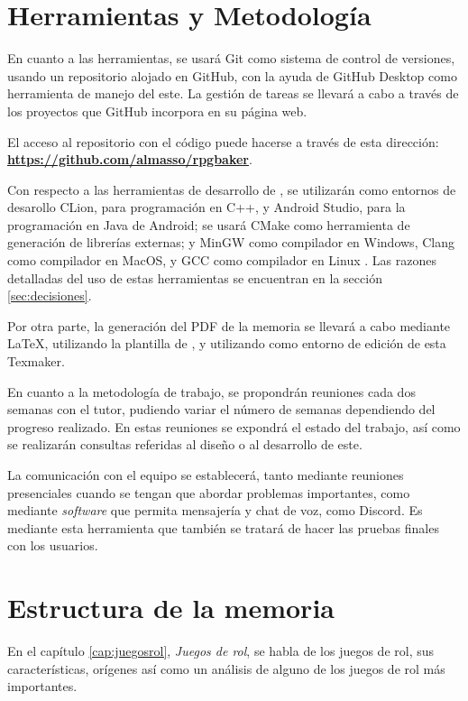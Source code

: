 \section{Herramientas y Metodología}
En cuanto a las herramientas, se usará Git como sistema de control de versiones, usando un repositorio alojado en GitHub, con la ayuda de GitHub Desktop como herramienta de manejo del este. La gestión de tareas se llevará a cabo a través de los proyectos que GitHub incorpora en su página web.

\smallskip

El acceso al repositorio con el código puede hacerse a través de esta dirección: \href{https://github.com/almasso/rpgbaker}{\textbf{https://github.com/almasso/rpgbaker}}.

\medskip

Con respecto a las herramientas de desarrollo de \baker, se utilizarán como entornos de desarollo CLion, para programación en C++, y Android Studio, para la programación en Java de Android; se usará CMake como herramienta de generación de librerías externas; y MinGW como compilador en Windows, Clang como compilador en MacOS, y GCC como compilador en Linux . Las razones detalladas del uso de estas herramientas se encuentran en la sección \ref{sec:decisiones}.

\medskip

Por otra parte, la generación del PDF de la memoria se llevará a cabo mediante \LaTeX , utilizando la plantilla de \texis , y utilizando como entorno de edición de esta Texmaker.

\bigskip

En cuanto a la metodología de trabajo, se propondrán reuniones cada dos semanas con el tutor, pudiendo variar el número de semanas dependiendo del progreso realizado. En estas reuniones se expondrá el estado del trabajo, así como se realizarán consultas referidas al diseño o al desarrollo de este.

\medskip

La comunicación con el equipo se establecerá, tanto mediante reuniones presenciales cuando se tengan que abordar problemas importantes, como mediante \textit{software} que permita mensajería y chat de voz, como Discord. Es mediante esta herramienta que también se tratará de hacer las pruebas finales con los usuarios.

\section{Estructura de la memoria} 
En el capítulo \ref{cap:juegosrol}, \textit{Juegos de rol}, se habla de los juegos de rol, sus características, orígenes así como un análisis de alguno de los juegos de rol más importantes.

